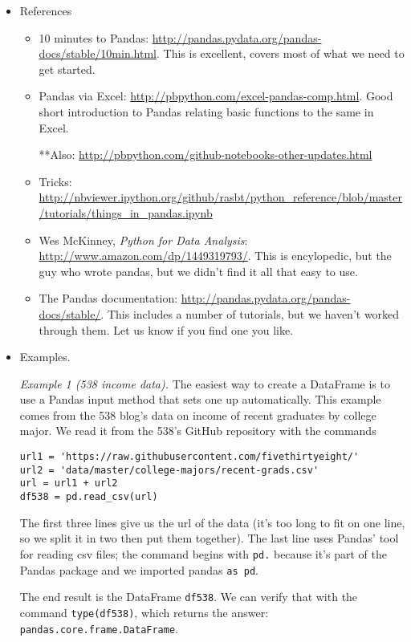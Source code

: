 \documentclass[11pt]{article}
\begin{document}
\begin{itemize}
\item References
\begin{itemize}
\item 10 minutes to Pandas:  \url{http://pandas.pydata.org/pandas-docs/stable/10min.html}.
This is excellent, covers most of what we need to get started.

\item Pandas via Excel:  \url{http://pbpython.com/excel-pandas-comp.html}.
Good short introduction to Pandas relating basic functions to the same in Excel.

**Also:  \url{http://pbpython.com/github-notebooks-other-updates.html}

\item Tricks:  \url{http://nbviewer.ipython.org/github/rasbt/python_reference/blob/master/tutorials/things_in_pandas.ipynb}

\item Wes McKinney, {\it Python for Data Analysis\/}: \url{http://www.amazon.com/dp/1449319793/}.
This is encylopedic, but the guy who wrote pandas, but we didn't find it all that easy
to use.

\item The Pandas documentation:  \url{http://pandas.pydata.org/pandas-docs/stable/}.
This includes a number of tutorials, but we haven't worked through them.
Let us know if you find one you like.
\end{itemize}

\item Examples.

{\it Example 1 (538 income data).\/}
The easiest way to create a DataFrame is to use a Pandas input method
that sets one up automatically.
This example comes from the 538 blog's data on income of recent graduates by
college major.
We read it from the 538's GitHub repository with the commands
\begin{verbatim}
url1 = 'https://raw.githubusercontent.com/fivethirtyeight/'
url2 = 'data/master/college-majors/recent-grads.csv'
url = url1 + url2
df538 = pd.read_csv(url)
\end{verbatim}
The first three lines give us the url of the data
(it's too long to fit on one line, so we split it in two
then put them together).
The last line uses Pandas' tool for reading csv files;
the command begins with {\tt pd.} because it's part of the Pandas
package and we imported pandas {\tt as pd}.

The end result is the DataFrame {\tt df538}.
We can verify that with the command {\tt type(df538)},
which returns the answer:  {\tt pandas.core.frame.DataFrame}.


\end{itemize}
\end{document}
